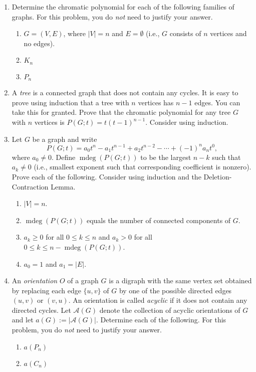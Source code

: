 \documentclass[11pt]{article}%
\theoremstyle{definition}
\DeclareMathOperator{\mdeg}{mdeg}
\DeclareRobustCommand{\rchi}{{\mathpalette\irchi\relax}}
\newcommand{\irchi}[2]{\raisebox{\depth}{$#1\chi$}}
\begin{document}
\begin{enumerate}

\item Determine the chromatic polynomial for each of the following families of graphs. For this problem, you do \emph{not} need to justify your answer.
\begin{enumerate}
\item $G=(V,E)$, where $|V|=n$ and $E=\emptyset$ (i.e., $G$ consists of $n$ vertices and no edges).
\item $K_n$
\item $P_n$
\end{enumerate}

\item A \emph{tree} is a connected graph that does not contain any cycles. It is easy to prove using induction that a tree with $n$ vertices has $n-1$ edges. You can take this for granted. Prove that the chromatic polynomial for any tree $G$ with $n$ vertices is $P(G;t)=t(t-1)^{n-1}$. Consider using induction.

\item Let $G$ be a graph and write
\[
P(G;t)=a_0t^n-a_1t^{n-1}+a_2t^{n-2}-\cdots +(-1)^na_nt^0,
\]
where $a_0\neq 0$. Define $\mdeg(P(G;t))$ to be the largest $n-k$ such that $a_k\neq 0$ (i.e., smallest exponent such that corresponding coefficient is nonzero). Prove each of the following. Consider using induction and the Deletion-Contraction Lemma.
\begin{enumerate}
\item $|V|=n$.
\item $\mdeg(P(G;t))$ equals the number of connected components of $G$.
\item $a_k\geq 0$ for all $0\leq k\leq n$ and $a_k>0$ for all $0\leq k\leq n-\mdeg(P(G;t))$.
\item $a_0=1$ and $a_1=|E|$.
\end{enumerate}

\item An \emph{orientation} $O$ of a graph $G$ is a digraph with the same vertex set obtained by replacing each edge $\{u,v\}$ of $G$ by one of the possible directed edges $(u,v)$ or $(v,u)$.  An orientation is called \emph{acyclic} if it does not contain any directed cycles.  Let $\mathcal{A}(G)$ denote the collection of acyclic orientations of $G$ and let $a(G):=|\mathcal{A}(G)|$. 
Determine each of the following. For this problem, you do \emph{not} need to justify your answer.
\begin{enumerate}
\item $a(P_n)$
\item $a(C_n)$
\end{enumerate}


\end{enumerate}
\end{document}
